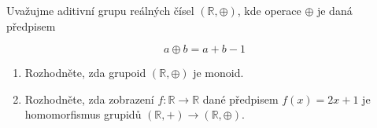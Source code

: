 \subsubsection{}
Uvažujme aditivní grupu reálných čísel $(\mathbb{R}, \oplus)$, kde operace
$\oplus$ je daná předpisem

$$a\oplus b=a+b-1$$

\begin{enumerate}
  \item Rozhodněte, zda grupoid $(\mathbb{R}, \oplus)$ je monoid.
  \item Rozhodněte, zda zobrazení $f:\mathbb{R} \rightarrow \mathbb{R}$ dané
  předpisem $f(x) = 2x + 1$ je homomorfismus grupidů $(\mathbb{R}, +)
  \rightarrow (\mathbb{R}, \oplus)$.
\end{enumerate}
